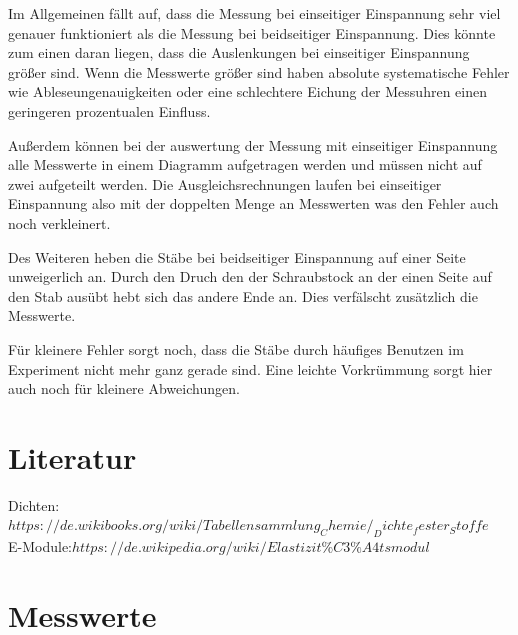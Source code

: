 \noindent Im Allgemeinen fällt auf, dass die Messung bei einseitiger Einspannung sehr viel genauer funktioniert als die Messung bei beidseitiger Einspannung. Dies könnte zum einen daran liegen, dass die Auslenkungen bei einseitiger Einspannung größer sind. Wenn die Messwerte größer sind haben absolute systematische Fehler wie Ableseungenauigkeiten oder eine schlechtere Eichung der Messuhren einen geringeren prozentualen Einfluss. 

\noindent Außerdem können bei der auswertung der Messung mit einseitiger Einspannung alle Messwerte in einem Diagramm aufgetragen werden und müssen nicht auf zwei aufgeteilt werden. Die Ausgleichsrechnungen laufen bei einseitiger Einspannung also mit der doppelten Menge an Messwerten was den Fehler auch noch verkleinert. 

\noindent Des Weiteren heben die Stäbe bei beidseitiger Einspannung auf einer Seite unweigerlich an. Durch den Druch den der Schraubstock an der einen Seite auf den Stab ausübt hebt sich das andere Ende an. Dies verfälscht zusätzlich die Messwerte.

\noindent Für kleinere Fehler sorgt noch, dass die Stäbe durch häufiges Benutzen im Experiment nicht mehr ganz gerade sind. Eine leichte Vorkrümmung sorgt hier auch noch für kleinere Abweichungen.

\section{Literatur}

Dichten:\hyperlink{Dichte}{$https://de.wikibooks.org/wiki/Tabellensammlung_Chemie/_Dichte_fester_Stoffe$}\\
E-Module:\hyperlink{E-modul}{$https://de.wikipedia.org/wiki/Elastizit\%C3\%A4tsmodul$}

\section{Messwerte}

